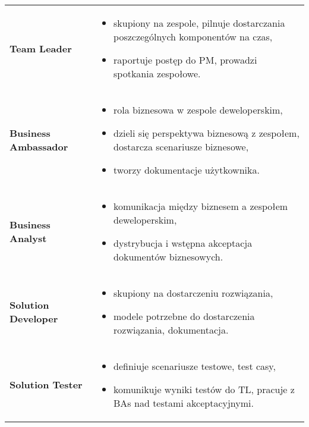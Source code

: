 \documentclass[../main.tex]{subfiles}
\begin{document}
\begin{table}[H]
\begin{center}
\begin{tabular}{ p{} p{} }
                \textbf{Team Leader}
                &
                \begin{itemize}
                    \item skupiony na zespole, pilnuje dostarczania poszczególnych komponentów na czas,
                    \item raportuje postęp do PM, prowadzi spotkania zespołowe.
                \end{itemize}
                \\

                \textbf{Business Ambassador}
                &
                \begin{itemize}
                    \item rola biznesowa w zespole deweloperskim,
                    \item dzieli się perspektywa biznesową z zespołem, dostarcza scenariusze biznesowe,
                    \item tworzy dokumentacje użytkownika.
                \end{itemize}
                \\

                \textbf{Business Analyst}
                &
                \begin{itemize}
                    \item komunikacja między biznesem a zespołem deweloperskim,
                    \item dystrybucja i wstępna akceptacja dokumentów biznesowych.
                \end{itemize}
                \\

                \textbf{Solution Developer}
                &
                \begin{itemize}
                    \item skupiony na dostarczeniu rozwiązania,
                    \item modele potrzebne do dostarczenia rozwiązania, dokumentacja.
                \end{itemize}
                \\

                \textbf{Solution Tester}
                &
                \begin{itemize}
                    \item definiuje scenariusze testowe, test casy,
                    \item komunikuje wyniki testów do TL, pracuje z BAs nad testami akceptacyjnymi.
                \end{itemize}
                \\

            \end{tabular}
        \end{center}
    \end{table}
\end{document}
